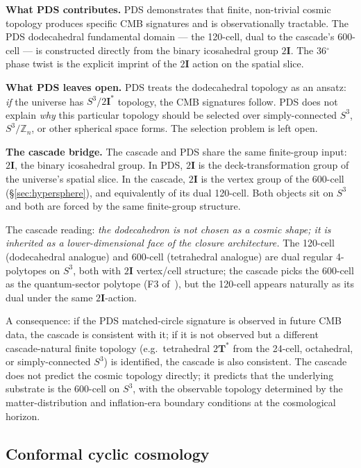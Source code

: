 \documentclass[11pt]{article}
\theoremstyle{plain}
\theoremstyle{definition}
\theoremstyle{remark}
\newcommand{\twoI}{2\mathbf{I}}
\newcommand{\twoT}{2\mathbf{T}}
\begin{document}
\medskip
\noindent\textbf{What PDS contributes.} PDS demonstrates that finite, non-trivial cosmic topology produces specific CMB signatures and is observationally tractable. The PDS dodecahedral fundamental domain --- the 120-cell, dual to the cascade's 600-cell --- is constructed directly from the binary icosahedral group $\twoI$. The 36$^\circ$ phase twist is the explicit imprint of the $\twoI$ action on the spatial slice.

\medskip
\noindent\textbf{What PDS leaves open.} PDS treats the dodecahedral topology as an ansatz: \emph{if} the universe has $S^3/\twoI^\ast$ topology, the CMB signatures follow. PDS does not explain \emph{why} this particular topology should be selected over simply-connected $S^3$, $S^3/\mathbb{Z}_n$, or other spherical space forms. The selection problem is left open.

\medskip
\noindent\textbf{The cascade bridge.} The cascade and PDS share the same finite-group input: $\twoI$, the binary icosahedral group. In PDS, $\twoI$ is the deck-transformation group of the universe's spatial slice. In the cascade, $\twoI$ is the vertex group of the 600-cell (\S\ref{sec:hypersphere}), and equivalently of its dual 120-cell. Both objects sit on $S^3$ and both are forced by the same finite-group structure.

The cascade reading: \emph{the dodecahedron is not chosen as a cosmic shape; it is inherited as a lower-dimensional face of the closure architecture.} The 120-cell (dodecahedral analogue) and 600-cell (tetrahedral analogue) are dual regular 4-polytopes on $S^3$, both with $\twoI$ vertex/cell structure; the cascade picks the 600-cell as the quantum-sector polytope (F3 of~\citealp{SmartXXXVI}), but the 120-cell appears naturally as its dual under the same $\twoI$-action.

A consequence: if the PDS matched-circle signature is observed in future CMB data, the cascade is consistent with it; if it is not observed but a different cascade-natural finite topology (e.g.\ tetrahedral $\twoT^\ast$ from the 24-cell, octahedral, or simply-connected $S^3$) is identified, the cascade is also consistent. The cascade does not predict the cosmic topology directly; it predicts that the underlying substrate is the 600-cell on $S^3$, with the observable topology determined by the matter-distribution and inflation-era boundary conditions at the cosmological horizon.

\subsection{Conformal cyclic cosmology}\label{sec:bridge-ccc}
\end{document}
